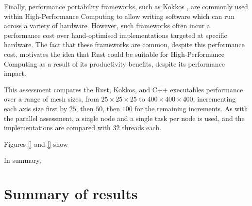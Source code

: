 Finally, performance portability frameworks, such as Kokkos \cite{KokkosEcosystem}, are commonly used within High-Performance Computing to allow writing software which can run across a variety of hardware. However, such frameworks often incur a performance cost over hand-optimised implementations targeted at specific hardware. The fact that these frameworks are common, despite this performance cost, motivates the idea that Rust could be suitable for High-Performance Computing as a result of its productivity benefits, despite its performance impact.

This assessment compares the Rust, Kokkos, and C++ executables performance over a range of mesh sizes, from $25 \times 25 \times 25$ to $400 \times 400 \times 400$, incrementing each axis size first by $25$, then $50$, then $100$ for the remaining increments. As with the parallel assessment, a single node and a single task per node is used, and the implementations are compared with 32 threads each.

Figures \ref{} and \ref{} show 


In summary,



\section{Summary of results}
\label{sec:performance-results}


